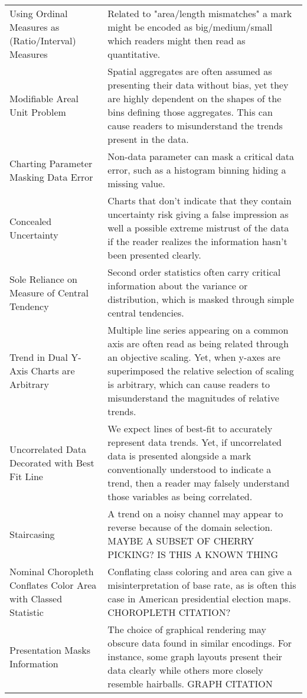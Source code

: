 \begin{table*}[]
\begin{tabular}{p{5cm}p{12cm}}
 \rowcolor{colorc}Using Ordinal Measures as (Ratio/Interval) Measures & Related to "area/length mismatches" a mark might be encoded as big/medium/small which readers might then read as quantitative. \cite{stevens1946theory, few2019loom}\\
 \rowcolor{colorc-opaque}Modifiable Areal Unit Problem  & Spatial aggregates are often assumed as presenting their data without bias, yet they are highly dependent on the shapes of the bins defining those aggregates. This can cause readers to misunderstand the trends present in the data. \cite{fotheringham1991modifiable, kindlmann2014algebraic}\\
 \rowcolor{colorc}Charting Parameter Masking Data Error & Non-data parameter can mask a critical data error, such as a histogram binning hiding a missing value. \cite{correll2018looks}\\
 \rowcolor{colorc-opaque}Concealed Uncertainty & Charts that don't indicate that they contain uncertainty risk giving a false impression as well a possible extreme mistrust of the data if the reader realizes the information hasn't been presented clearly.  \cite{song2018s, few2019loom, mayrTrust2019, sacha2015role}\\
 \rowcolor{colorc}Sole Reliance on Measure of Central Tendency & Second order statistics often carry critical information about the variance or distribution, which is masked through simple central tendencies.  \cite{wall2017warning, few2019loom, matejka2017same, anscombe1973graphs}\\
 \rowcolor{colorc-opaque}Trend in Dual Y-Axis Charts are Arbitrary  & Multiple line series appearing on a common axis are often read as being related through an objective scaling. Yet, when y-axes are superimposed the relative selection of scaling is arbitrary, which can cause readers to misunderstand the magnitudes of relative trends. \cite{KindlmannAlgebraicVisPedagogyPDV2016, cairo2015graphics}\\
 \rowcolor{colorc}Uncorrelated Data Decorated with Best Fit Line  & We expect lines of best-fit to accurately represent data trends. Yet, if uncorrelated data is presented alongside a mark conventionally understood to indicate a trend, then a reader may falsely understand those variables as being correlated.   \\
 \rowcolor{colorc-opaque}Staircasing & A trend on a noisy channel may appear to reverse because of the domain selection. MAYBE A SUBSET OF CHERRY PICKING? IS THIS A KNOWN THING\\
 \rowcolor{colorc}Nominal Choropleth Conflates Color Area with Classed Statistic & Conflating class coloring and area can give a misinterpretation of base rate, as is often this case in American presidential election maps.  \cite{gastner2005maps} CHOROPLETH CITATION?\\
 \rowcolor{colorc-opaque}Presentation Masks Information & The choice of graphical rendering may obscure data found in similar encodings. For instance, some graph layouts present their data clearly while others more closely resemble hairballs. \cite{hofmann2012graphical} GRAPH CITATION\\


\end{tabular}
\end{table*}
